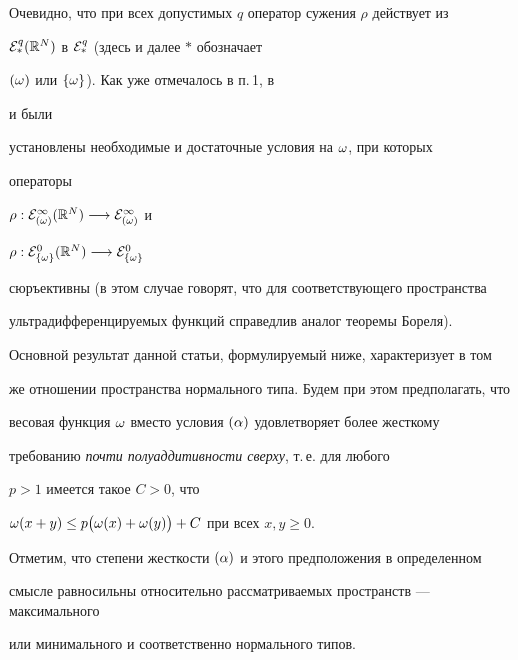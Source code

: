 Очевидно, что при всех допустимых $q$ оператор сужения $\rho$ действует из 


${\cal E}_{*}^q(\Bbb R^N)$ в ${\cal E}_{*}^q$ (здесь и далее $*$ обозначает 


$(\omega)$ или $\{\omega\}$). Как уже отмечалось в п.\,1, в \cite{Mei88}


и \cite{Bon89} были 


установлены необходимые и достаточные условия на $\omega$, при которых 


операторы 


$\rho:{\cal E}_{(\omega)}^{\infty}(\Bbb R^N)\longrightarrow{\cal E}_{(\omega)}^{\infty}$ и 


$\rho:{\cal E}_{\{\omega\}}^0(\Bbb R^N)\longrightarrow{\cal E}_{\{\omega\}}^0$ 


сюръективны (в этом случае говорят, что для соответствующего пространства 


ультрадифференцируемых функций справедлив аналог теоремы Бореля). 


Основной результат данной статьи, формулируемый ниже, характеризует в том 


же отношении пространства нормального типа. Будем при этом предполагать, что 


весовая функция $\omega$ вместо условия $(\alpha)$ удовлетворяет более жесткому 


требованию {\it почти полуаддитивности сверху}, т.\,е. для любого 


$p>1$ имеется такое $C>0$, что 


$\omega(x+y)\le p \big(\omega(x)+\omega(y)\big)+C$ при всех $x,y\ge 0$.


Отметим, что степени жесткости $(\alpha)$ и этого предположения в определенном 


смысле равносильны относительно рассматриваемых пространств --- максимального 


или минимального и соответственно нормального типов.





